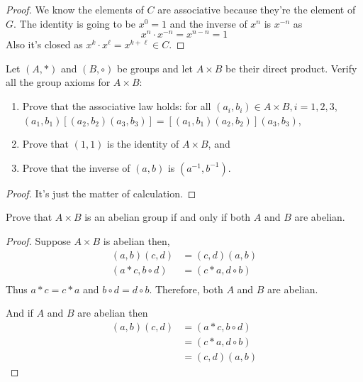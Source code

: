 \begin{proof}
    We know the elements of $C$ are associative because they're the element of $G$.
    The identity is going to be $x^{0}=1$ and the inverse of $x^n$ is $x^{-n}$ as 
    \[ x^{n} \cdot x^{-n} = x^{n-n}=1 \]
    Also it's closed as $x^k \cdot x^{\ell} = x^{k+\ell} \in C$.
\end{proof}

\begin{problem}
    Let $(A, *)$ and $(B, \circ)$ be groups and let $A \times B$ be their direct product. Verify all the group axioms for $A \times B$:
    \begin{enumerate}
        \item Prove that the associative law holds: for all $(a_i, b_i) \in A \times B, i=1,2,3$,\\
        $(a_1, b_1)[(a_2, b_2)(a_3, b_3)] = [(a_1, b_1)(a_2, b_2)](a_3, b_3)$,
        \item Prove that $(1, 1)$ is the identity of $A \times B$, and
        \item Prove that the inverse of $(a, b)$ is $(a^{-1}, b^{-1})$.
    \end{enumerate}
\end{problem}

\begin{proof}
    It's just the matter of calculation.
\end{proof}

\begin{problem}
     Prove that $A \times B$ is an abelian group if and only if both $A$ and $B$ are abelian.
\end{problem}

\begin{proof}
    Suppose $A \times B$ is abelian then,
    \begin{align*}
        (a,b)(c,d) &= (c,d)(a,b) \\
        (a * c, b \circ d) &= (c * a,d \circ b) \\
    \end{align*}
    Thus $a*c=c*a$ and $b \circ d = d \circ b$. Therefore, both $A$ and $B$ are abelian.

    And if $A$ and $B$ are abelian then
    \begin{align*}
        (a,b)(c,d) &= (a * c, b \circ d) \\
        &= (c * a, d \circ b) \\
        &= (c,d)(a,b)
    \end{align*}
\end{proof}

